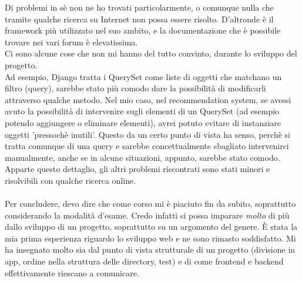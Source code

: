\documentclass[12pt]{article}
\begin{document}
	\noindent Di problemi in sè non ne ho trovati particolarmente, o comunque nulla che tramite qualche ricerca su Internet non possa essere risolto. D'altronde è il framework più utilizzato nel suo ambito, e la documentazione che è possibile trovare nei vari forum è elevatissima. \\
	Ci sono alcune cose che non mi hanno del tutto convinto, durante lo sviluppo del progetto. \\
	Ad esempio, Django tratta i QuerySet come liste di oggetti che matchano un filtro (query), sarebbe stato più comodo dare la possibilità di modificarli attraverso qualche metodo. Nel mio caso, nel recommendation system, se avessi avuto la possibilità di intervenire sugli elementi di un QuerySet (ad esempio potendo aggiungere o eliminare elementi), avrei potuto evitare di instanziare oggetti 'pressochè inutili'. Questo da un certo punto di vista ha senso, perchè si tratta comunque di una query e sarebbe concettualmente sbagliato intervenirci manualmente, anche se in alcune situazioni, appunto, sarebbe stato comodo. Apparte questo dettaglio, gli altri problemi riscontrati sono stati minori e risolvibili con qualche ricerca online. \\ \\
	Per concludere, devo dire che come corso mi è piaciuto fin da subito, soprattutto considerando la modalità d'esame. Credo infatti si possa imparare \textit{molto} di più dallo sviluppo di un progetto, soprattutto su un argomento del genere. È stata la mia prima esperienza riguardo lo sviluppo web e ne sono rimasto soddisfatto. Mi ha insegnato molto sia dal punto di vista strutturale di un progetto (divisione in app, ordine nella struttura delle directory, test) e di come frontend e backend effettivamente riescano a comunicare. \\
	
	
	
	
\end{document}
